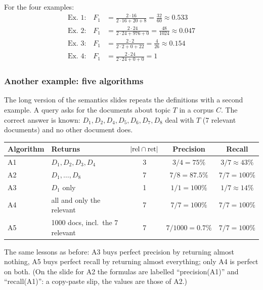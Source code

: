 For the four examples:
\begin{align*}
  \text{Ex.\ 1:}\quad F_1 &= \frac{2\cdot 16}{2\cdot 16 + 20 + 8} = \frac{32}{60} \approx 0.533 \\
  \text{Ex.\ 2:}\quad F_1 &= \frac{2\cdot 24}{2\cdot 24 + 976 + 0} = \frac{48}{1024} \approx 0.047 \\
  \text{Ex.\ 3:}\quad F_1 &= \frac{2\cdot 2}{2\cdot 2 + 0 + 22} = \frac{4}{26} \approx 0.154 \\
  \text{Ex.\ 4:}\quad F_1 &= \frac{2\cdot 24}{2\cdot 24 + 0 + 0} = 1
\end{align*}

\subsubsection{Another example: five algorithms}

The long version of the semantics slides repeats the definitions with a second example.
A query asks for the documents about topic $T$ in a corpus $C$. The correct answer is
known: $D_1, D_2, D_4, D_5, D_6, D_7, D_8$ deal with $T$ (7 relevant documents) and no
other document does.

\begin{center}
\footnotesize
\begin{tabular}{@{}l l c c c@{}}
\toprule
\textbf{Algorithm} & \textbf{Returns} & $\lvert \text{rel}\cap\text{ret}\rvert$ & \textbf{Precision} & \textbf{Recall} \\
\midrule
A1 & $D_1, D_2, D_3, D_4$            & 3 & $3/4 = 75\%$       & $3/7 \approx 43\%$ \\
A2 & $D_1, \dots, D_8$               & 7 & $7/8 = 87.5\%$     & $7/7 = 100\%$ \\
A3 & $D_1$ only                      & 1 & $1/1 = 100\%$      & $1/7 \approx 14\%$ \\
A4 & all and only the relevant & 7 & $7/7 = 100\%$      & $7/7 = 100\%$ \\
A5 & 1000 docs, incl.\ the 7 relevant & 7 & $7/1000 = 0.7\%$ & $7/7 = 100\%$ \\
\bottomrule
\end{tabular}
\end{center}

The same lessons as before: A3 buys perfect precision by returning almost nothing, A5
buys perfect recall by returning almost everything; only A4 is perfect on both. (On the
slide for A2 the formulas are labelled ``precision(A1)'' and ``recall(A1)'': a
copy-paste slip, the values are those of A2.)

